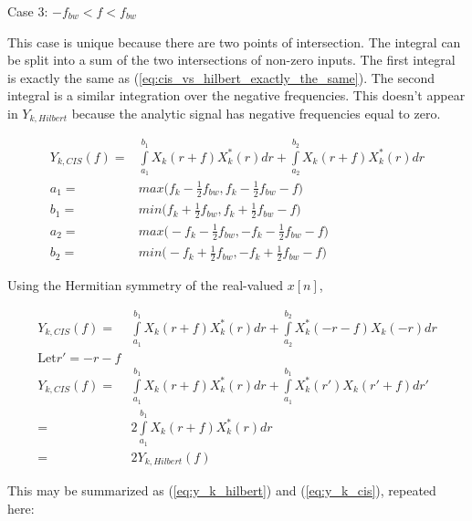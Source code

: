 \documentclass [11pt, proquest,oneside] {ganter_thesis}[2015/03/03]
\begin{document}
Case 3: $- f_{bw} < f < f_{bw}$

This case is unique because there are two points of intersection.  The integral can be split into a sum of the two intersections of non-zero inputs.  The first integral is exactly the same as (\ref{eq:cis_vs_hilbert_exactly_the_same}).  The second integral is a similar integration over the negative frequencies.  This doesn't appear in $Y_{k,Hilbert}$ because the analytic signal has negative frequencies equal to zero.

\begin{align}
Y_{k,CIS}(f) =& \int\limits_{a_1}^{b_1} X_{k}(r + f) X_{k}^*(r)dr + \int\limits_{a_2}^{b_2} X_{k}(r + f) X_{k}^*(r)dr \\
a_1 =& max\Big( f_k - \frac{1}{2} f_{bw},  f_k - \frac{1}{2} f_{bw} - f\Big) \\
b_1 =& min\Big( f_k + \frac{1}{2} f_{bw},  f_k + \frac{1}{2} f_{bw} - f\Big) \\
a_2 =& max\Big( -f_k - \frac{1}{2} f_{bw},  -f_k - \frac{1}{2} f_{bw} - f\Big) \\
b_2 =& min\Big( -f_k + \frac{1}{2} f_{bw},  -f_k + \frac{1}{2} f_{bw} - f\Big)
\end{align}

Using the Hermitian symmetry of the real-valued $x[n]$,

\begin{align}
Y_{k,CIS}(f) =& \int\limits_{a_1}^{b_1} X_{k}(r + f) X_{k}^*(r)dr + \int\limits_{a_2}^{b_2} X_{k}^*(-r - f) X_{k}(-r)dr \\
%
\mathrm{Let} r' = -r - f \nonumber \\
%
Y_{k,CIS}(f) =& \int\limits_{a_1}^{b_1} X_{k}(r + f) X_{k}^*(r)dr + \int\limits_{a_1}^{b_1} X_{k}^*(r') X_{k}(r' + f)dr' \\
=& 2 \int\limits_{a_1}^{b_1} X_{k}(r + f) X_{k}^*(r)dr \\
=& 2 Y_{k,Hilbert}(f)
\end{align}

This may be summarized as (\ref{eq:y_k_hilbert}) and (\ref{eq:y_k_cis}), repeated here:
\end{document}
